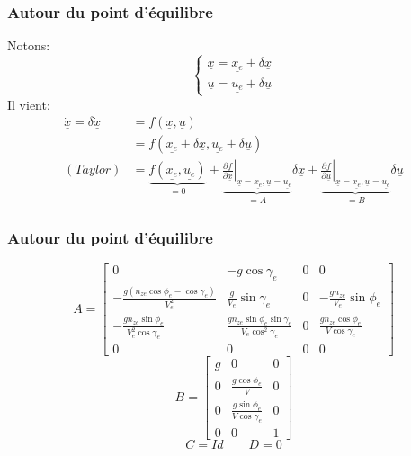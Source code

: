 \documentclass[footheight=2em]{beamer}
\begin{document}
\begin{frame}
    \frametitle{Autour du point d'équilibre}\pause
    Notons:
    $$
    \left\{
    \begin{array}{l}
        \underline{x} = \underline{x_e} + \delta \underline{x} \\
        \underline{u} = \underline{u_e} + \delta \underline{u}
    \end{array}
    \right.
    $$\pause
    Il vient:
    \begin{align*}
        \underline{\dot{x}} = \delta \underline{\dot{x}} &=
        f(\underline{x}, \underline{u}) \\
            &= f(\underline{x_e} + \delta \underline{x},
                 \underline{u_e} + \delta \underline{u}) \\
            (Taylor) &= \underbrace{f(\underline{x_e}, \underline{u_e})}_{=0} +
                        \underbrace
                        {
                        \left.
                        \frac{\partial f}{\partial \underline{x}}
                        \right| _{\underline{x} = \underline{x_e},
                                 \underline{u} = \underline{u_e}}
                        }_{=A}\delta \underline{x}
                        +
                        \underbrace
                        {
                         \left.
                         \frac{\partial f}{\partial \underline{u}}
                         \right| _{\underline{x} = \underline{x_e},
                                  \underline{u} = \underline{u_e}}
                        }_{=B}\delta \underline{u}
    \end{align*}
\end{frame}

\begin{frame}
    \frametitle{Autour du point d'équilibre}\pause
    $$
    A =
    \left[
    \begin{array}{cccc}
        0 & -g \cos \gamma_e & 0 & 0 \\
        -\frac{g(n_{ze} \cos \phi_e - \cos \gamma_e)}{V_e^2}
            & \frac{g}{V_e}\sin \gamma_e & 0
            & -\frac{gn_{ze}}{V_e}\sin \phi_e \\
        -\frac{gn_{ze} \sin \phi_e}{V_e^2 \cos \gamma_e}
            & \frac{gn_{ze} \sin \phi_e \sin \gamma_e}{V_e \cos^2 \gamma_e}
            & 0 & \frac{gn_{ze}\cos \phi_e}{V \cos \gamma_e} \\
        0 & 0 & 0 & 0
    \end{array}
    \right]
    $$\pause
    $$
    B =
    \left[
    \begin{array}{cccc}
        g & 0 & 0 \\
        0 & \frac{g\cos \phi_e}{V} & 0 \\
        0 & \frac{g\sin \phi_e}{V\cos \gamma_e} & 0 \\
        0 & 0 & 1
    \end{array}
    \right]
    $$\pause
    $$
    C = Id \qquad D = 0
    $$
\end{frame}
\end{document}
